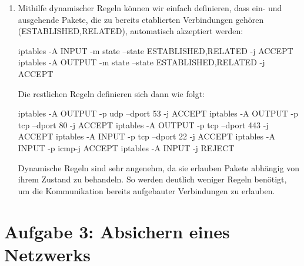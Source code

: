 \documentclass[a4paper,10pt]{scrartcl}
\begin{document}
\begin{enumerate}[\bfseries 1.]
	\item Mithilfe dynamischer Regeln können wir einfach definieren, dass ein- und
	      ausgehende Pakete, die zu bereits etablierten Verbindungen gehören
	      (ESTABLISHED,RELATED), automatisch akzeptiert werden:
	      \begin{rootcommands}
iptables -A INPUT -m state --state ESTABLISHED,RELATED -j ACCEPT
iptables -A OUTPUT -m state --state ESTABLISHED,RELATED -j ACCEPT
	      \end{rootcommands}
	      Die restlichen Regeln definieren sich dann wie folgt:
	      \begin{rootcommands}[]
iptables -A OUTPUT -p udp --dport 53 -j ACCEPT
iptables -A OUTPUT -p tcp --dport 80 -j ACCEPT
iptables -A OUTPUT -p tcp --dport 443 -j ACCEPT
iptables -A INPUT -p tcp --dport 22 -j ACCEPT
iptables -A INPUT -p icmp-j ACCEPT
iptables -A INPUT -j REJECT
	      \end{rootcommands}
	      Dynamische Regeln sind sehr angenehm, da sie erlauben Pakete abhängig
	      von ihrem Zustand zu behandeln. So werden deutlich weniger Regeln benötigt,
	      um die Kommunikation bereits aufgebauter Verbindungen zu erlauben.
\end{enumerate}

\section*{Aufgabe 3: Absichern eines Netzwerks}
\label{sec:Absichern eines Netzwerks}
\end{document}
